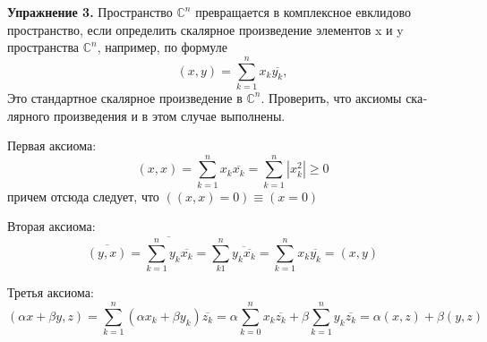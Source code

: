 \large{\bf{Упражнение 3.}} Пространство $ \mathbb{C}^n $ превращается в комплексное 
евкли­дово пространство, если определить скалярное произведение элементов x и y
пространства $ \mathbb{C}^n $, например, по формуле $$ (x, y) = \sum_{k = 1}^{n} x_k \overline{y_k}, $$
Это стандартное скалярное произведение в $ \mathbb{C}^n $. Проверить, что аксиомы ска­
лярного произведения и в этом случае выполнены.
\begin{solution}
    Первая аксиома: $$ (x, x) = \sum_{k = 1}^{n} x_k \overline{x_k} = \sum_{k = 1}^{n} |x_k^2| \geq 0 $$
    причем отсюда следует, что $ ((x, x) = 0) \equiv (x = 0) $ \par
    Вторая аксиома: $$ \overline{(y, x)} = \overline{\sum_{k = 1}^{n} y_k \overline{x_k}} = \sum_{k  1}^{n} \overline{y_k \overline{x_k}} = \sum_{k = 1}^{n} x_k \overline{y_k} = (x, y) $$ \par
    Третья аксиома: $$ (\alpha x + \beta y, z) = \sum_{k = 1}^{n} (\alpha x_k + \beta y_k) \overline{z_k} = \alpha \sum_{k = 0}^{n} x_k \overline{z_k} + \beta \sum_{k = 1}^{n} y_k \overline{z_k} = \alpha (x, z) + \beta (y, z) $$ \par 
\end{solution}\pagebreak
